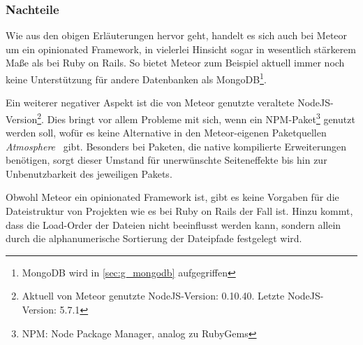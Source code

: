 \subsubsection{Nachteile}
\label{sssec:elm_nachteile}

Wie aus den obigen Erläuterungen hervor geht, handelt es sich auch bei
Meteor um ein opinionated Framework, in vielerlei Hinsicht sogar in wesentlich
stärkerem Maße als bei Ruby on Rails.  So bietet Meteor zum Beispiel aktuell
immer noch keine Unterstützung für andere Datenbanken als
MongoDB\footnote{MongoDB wird in \cref{sec:g_mongodb} aufgegriffen}.

Ein weiterer negativer Aspekt ist die von Meteor genutzte veraltete
NodeJS-Version\footnote{Aktuell von Meteor genutzte NodeJS-Version: 0.10.40.
Letzte NodeJS-Version: 5.7.1}.  Dies bringt vor allem Probleme mit sich, wenn
ein NPM-Paket\footnote{NPM: Node Package Manager, analog zu RubyGems} genutzt
werden soll, wofür es keine Alternative in den Meteor-eigenen Paketquellen
\emph{Atmosphere}~\cite{atmospherejs} gibt.  Besonders bei Paketen, die native
kompilierte Erweiterungen benötigen, sorgt dieser Umstand für unerwünschte
Seiteneffekte bis hin zur Unbenutzbarkeit des jeweiligen Pakets.

Obwohl Meteor ein opinionated Framework ist, gibt es keine Vorgaben für die
Dateistruktur von Projekten wie es bei Ruby on Rails der Fall ist.  Hinzu kommt,
dass die Load-Order der Dateien nicht beeinflusst werden kann, sondern allein
durch die alphanumerische Sortierung der Dateipfade festgelegt wird.
